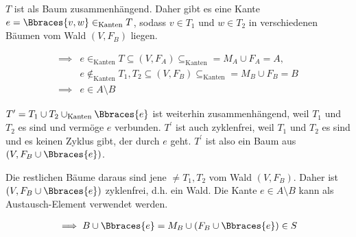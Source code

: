 \begin{solution}
\begin{enumerate}[label = \arabic*.]
\begin{enumerate}[label = \arabic*.]
        $T$ ist als Baum zusammenhängend.
        Daher gibt es eine Kante $e = \Bbraces{v, w} \in_\mathrm{Kanten} T$, sodass $v \in T_1$ und $w \in T_2$ in verschiedenen Bäumen vom Wald $(V, F_B)$ liegen.

        \begin{align*}
            \implies
            & e \in_\mathrm{Kanten} T \subseteq (V, F_A) \subseteq_\mathrm{Kanten} = M_A \cup F_A = A, \\
            & e \not \in_\mathrm{Kanten} T_1, T_2 \subseteq (V, F_B) \subseteq_\mathrm{Kanten} = M_B \cup F_B = B \\
            \implies
            & e \in A \setminus B
        \end{align*}

        $T^\prime = T_1 \cup T_2 \cup_\mathrm{Kanten} \Bbraces{e}$ ist weiterhin zusammenhängend, weil $T_1$ und $T_2$ es sind und vermöge $e$ verbunden.
        $T^\prime$ ist auch zyklenfrei, weil $T_1$ und $T_2$ es sind und es keinen Zyklus gibt, der durch $e$ geht.
        $T^\prime$ ist also ein Baum aus $(V, F_B \cup \Bbraces{e})$.

        Die restlichen Bäume daraus sind jene $\neq T_1, T_2$ vom Wald $(V, F_B)$.
        Daher ist $(V, F_B \cup \Bbraces{e})$ zyklenfrei, d.h. ein Wald.
        Die Kante $e \in A \setminus B$ kann als Austausch-Element verwendet werden.

        \begin{align*}
            \implies
            B \cup \Bbraces{e}
            =
            M_B \cup (F_B \cup \Bbraces{e})
            \in S
        \end{align*}

    \end{enumerate}

\end{enumerate}

\end{solution}

